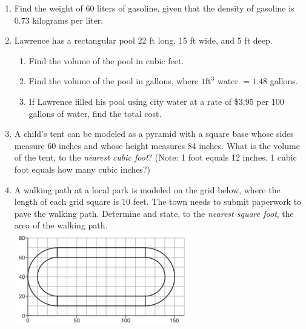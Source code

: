 \documentclass[12pt, twoside]{article}
\begin{document}
\begin{enumerate}
\newpage
  \item Find the weight of $60$ liters of gasoline, given that the density of gasoline is $0.73$ kilograms per liter. \vspace{2cm}

  \item Lawrence has a rectangular pool 22 ft long, 15 ft wide, and 5 ft deep.
  \begin{enumerate}
    \item Find the volume of the pool in cubic feet. \vspace{3cm}
    \item Find the volume of the pool in gallons, where $1 \mathrm{ ft}^3$ water $= 1.48$ gallons. \vspace{3cm}
    \item If Lawrence filled his pool using city water at a rate of \$3.95 per 100 gallons of water, find the total cost.
  \end{enumerate} \vspace{3cm}

  \item A child’s tent can be modeled as a pyramid with a square base whose sides measure 60 inches and whose height measures 84 inches. What is the volume of the tent, to the \emph{nearest cubic foot}? (Note: 1 foot equals 12 inches. 1 cubic foot equals how many cubic inches?) \vspace{4cm}

\newpage
  \item A walking path at a local park is modeled on the grid below, where the length of each grid square is 10 feet. The town needs to submit paperwork to pave the walking path. Determine and state, to the \emph{nearest square foot}, the area of the walking path.\\[0.3cm]
    \includegraphics[width=0.6\textwidth]{path_Jan2019-31.png} \vspace{3cm}


\end{enumerate}
\end{document}
